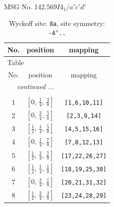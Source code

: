 \documentclass[fleqn,8pt]{jsarticle}
\begin{document}
\setcounter{MaxMatrixCols}{32}

\renewcommand{\tablename}{Table~}
\renewcommand{\figurename}{Figure~}
\begin{center}
\LARGE
MSG No. 142.569\quad$I4_{1}/a'c'd'$
\end{center}
\renewcommand{\arraystretch}{1.2}
\begin{longtable}{ccc}
\caption{Wyckoff site: {\tt 8a}, site symmetry: {\tt -4'..}}
 \\
 \hline \hline
No. & position & mapping \\ \hline \endfirsthead

\multicolumn{2}{l}{\tablename\ \thetable{}} \\
 \hline \hline
No. & position & mapping \\ \hline \endhead

 \hline \hline
\multicolumn{2}{r}{\footnotesize\it continued ...} \\ \endfoot

 \hline \hline
\multicolumn{2}{r}{} \\ \endlastfoot

1 & $\left[ 0,\, \frac{1}{4},\, \frac{3}{8} \right]$ & {\tt [1,6,10,11]} \\ \hline
2 & $\left[ 0,\, \frac{3}{4},\, \frac{5}{8} \right]$ & {\tt [2,3,9,14]} \\ \hline
3 & $\left[ \frac{1}{2},\, \frac{1}{4},\, \frac{5}{8} \right]$ & {\tt [4,5,15,16]} \\ \hline
4 & $\left[ 0,\, \frac{1}{4},\, \frac{7}{8} \right]$ & {\tt [7,8,12,13]} \\ \hline
5 & $\left[ \frac{1}{2},\, \frac{3}{4},\, \frac{7}{8} \right]$ & {\tt [17,22,26,27]} \\ \hline
6 & $\left[ \frac{1}{2},\, \frac{1}{4},\, \frac{1}{8} \right]$ & {\tt [18,19,25,30]} \\ \hline
7 & $\left[ 0,\, \frac{3}{4},\, \frac{1}{8} \right]$ & {\tt [20,21,31,32]} \\ \hline
8 & $\left[ \frac{1}{2},\, \frac{3}{4},\, \frac{3}{8} \right]$ & {\tt [23,24,28,29]} \\
\end{longtable}
\renewcommand{\arraystretch}{1.2}
\end{document}
